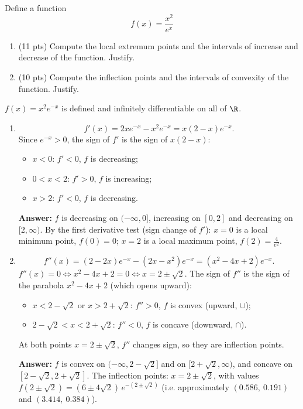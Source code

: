 
\begin{question}
Define a function
\[ f(x) = \frac{x^2}{e^x} \]
\begin{enumerate}
  \item (11 pts) Compute the local extremum points and the intervals of increase and decrease of the function. Justify.
  \item (10 pts) Compute the inflection points and the intervals of convexity of the function. Justify.
\end{enumerate}
\end{question}

\begin{solution}
$f(x) = x^2e^{-x}$ is defined and infinitely differentiable on all of $\R$.
\begin{enumerate}
  \item
  \[ f'(x) = 2xe^{-x} - x^2e^{-x} = x(2 - x)e^{-x}. \]
  Since $e^{-x} > 0$, the sign of $f'$ is the sign of $x(2-x)$:
  \begin{itemize}
    \item $x < 0$: $f' < 0$, $f$ is decreasing;
    \item $0 < x < 2$: $f' > 0$, $f$ is increasing;
    \item $x > 2$: $f' < 0$, $f$ is decreasing.
  \end{itemize}
  \textbf{Answer:} $f$ is decreasing on $(-\infty,0]$, increasing on $[0,2]$ and decreasing on $[2,\infty)$.
  By the first derivative test (sign change of $f'$): $x = 0$ is a local minimum point, $f(0) = 0$; $x = 2$ is a local maximum point, $f(2) = \frac{4}{e^2}$.

  \item
  \[ f''(x) = (2 - 2x)e^{-x} - (2x - x^2)e^{-x} = (x^2 - 4x + 2)e^{-x}. \]
  $f''(x) = 0 \iff x^2 - 4x + 2 = 0 \iff x = 2 \pm \sqrt{2}$. The sign of $f''$ is the sign of the parabola $x^2 - 4x + 2$ (which opens upward):
  \begin{itemize}
    \item $x < 2 - \sqrt2$ or $x > 2+\sqrt2$: $f'' > 0$, $f$ is convex (upward, $\cup$);
    \item $2-\sqrt2 < x < 2 + \sqrt 2$: $f'' < 0$, $f$ is concave (downward, $\cap$).
  \end{itemize}
  At both points $x = 2\pm\sqrt2$, $f''$ changes sign, so they are inflection points.

  \textbf{Answer:} $f$ is convex on $(-\infty, 2 - \sqrt2]$ and on $[2+\sqrt2, \infty)$, and concave on $[2-\sqrt2, 2+\sqrt2]$.
  The inflection points: $x = 2 \pm \sqrt2$, with values $f(2\pm\sqrt2) = (6 \pm 4\sqrt2)\,e^{-(2\pm\sqrt2)}$
  (i.e. approximately $(0.586,\ 0.191)$ and $(3.414,\ 0.384)$).
\end{enumerate}
\end{solution}

